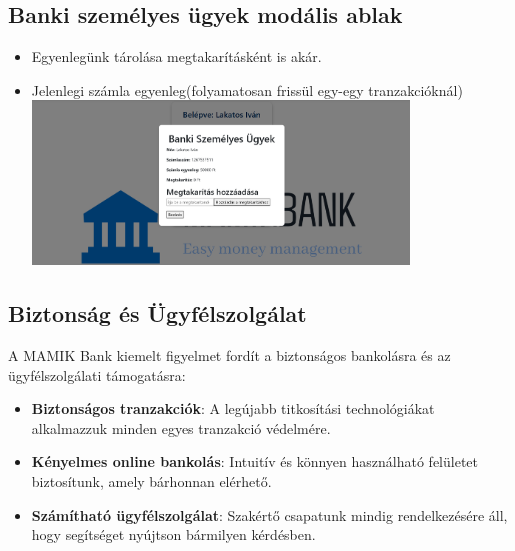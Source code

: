 \documentclass[colorlinks]{thesis-kando}
\theoremstyle{definition}
\theoremstyle{remark}
\begin{document}
\begin{itemize}
\subsection{Banki személyes ügyek modális ablak}
\begin{itemize}
    \item Egyenlegünk tárolása megtakarításként is akár.
    \item Jelenlegi számla egyenleg(folyamatosan frissül egy-egy tranzakcióknál)
    \\ 
    \includegraphics[width=10cm]{figures/szemelyesugyek.png}
\end{itemize}
    

\subsection{Biztonság és Ügyfélszolgálat}
A MAMIK Bank kiemelt figyelmet fordít a biztonságos bankolásra és az ügyfélszolgálati támogatásra:
\begin{itemize}
    \item \textbf{Biztonságos tranzakciók}: A legújabb titkosítási technológiákat alkalmazzuk minden egyes tranzakció védelmére.
    \item \textbf{Kényelmes online bankolás}: Intuitív és könnyen használható felületet biztosítunk, amely bárhonnan elérhető.
    \item \textbf{Számítható ügyfélszolgálat}: Szakértő csapatunk mindig rendelkezésére áll, hogy segítséget nyújtson bármilyen kérdésben. 
\end{itemize}
\newpage

\end{itemize}
\end{document}
